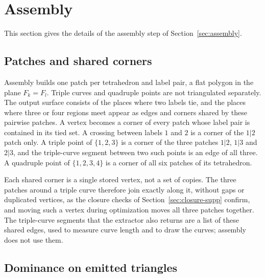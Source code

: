 \documentclass[11pt]{article}
\theoremstyle{definition}
\newcommand{\interp}{F}
\begin{document}
\section{Assembly}
\label{sec:assembly-supp}

This section gives the details of the assembly step of
Section~\ref{sec:assembly}.

\subsection{Patches and shared corners}

Assembly builds one patch per tetrahedron and label pair, a flat polygon in
the plane $\interp_k = \interp_l$. Triple curves and quadruple points are not
triangulated separately. The output surface consists of the places where two
labels tie, and the places where three or four regions meet appear as edges
and corners shared by these pairwise patches. A vertex becomes a corner of
every patch whose label pair is contained in its tied set. A
crossing between labels $1$ and $2$ is a corner of the $1|2$ patch only. A
triple point of $\{1,2,3\}$ is a corner of the three patches $1|2$, $1|3$ and
$2|3$, and the triple-curve segment between two such points is an edge of all
three. A quadruple
point of $\{1,2,3,4\}$ is a corner of all six patches of its tetrahedron.

Each shared corner is a single stored vertex, not a set of copies. The three
patches around a triple curve therefore join exactly along it, without gaps
or duplicated vertices, as the closure checks of
Section~\ref{sec:closure-supp} confirm, and moving such a vertex during
optimization moves all three patches together. The triple-curve segments that
the extractor also returns are a list of these shared edges, used to measure
curve length and to draw the curves; assembly does not use them.

\subsection{Dominance on emitted triangles}
\end{document}
